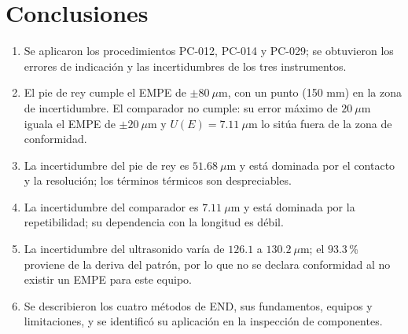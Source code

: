 \section{Conclusiones}

\begin{enumerate}
  \item Se aplicaron los procedimientos PC-012, PC-014 y PC-029; se obtuvieron los
        errores de indicación y las incertidumbres de los tres instrumentos.
  \item El pie de rey cumple el EMPE de $\pm 80\ \mu\text{m}$, con un punto
        (150 mm) en la zona de incertidumbre. El comparador no cumple: su error
        máximo de $20\ \mu\text{m}$ iguala el EMPE de $\pm 20\ \mu\text{m}$ y
        $U(E) = 7.11\ \mu\text{m}$ lo sitúa fuera de la zona de conformidad.
  \item La incertidumbre del pie de rey es $51.68\ \mu\text{m}$ y está dominada por
        el contacto y la resolución; los términos térmicos son despreciables.
  \item La incertidumbre del comparador es $7.11\ \mu\text{m}$ y está dominada por
        la repetibilidad; su dependencia con la longitud es débil.
  \item La incertidumbre del ultrasonido varía de $126.1$ a $130.2\ \mu\text{m}$;
        el $93.3$\,\% proviene de la deriva del patrón, por lo que no se declara
        conformidad al no existir un EMPE para este equipo.
  \item Se describieron los cuatro métodos de END, sus fundamentos, equipos y
        limitaciones, y se identificó su aplicación en la inspección de componentes.
\end{enumerate}
